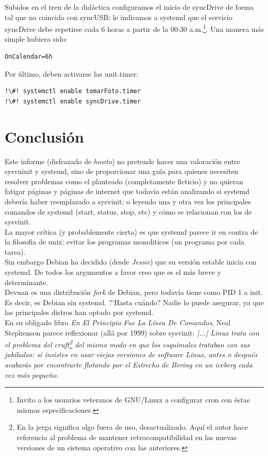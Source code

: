 \documentclass[10pt,a4paper]{article}
\begin{document}
Subidos en el tren de la did\'actica configuramos el inicio de syncDrive de forma tal que no coincida con syncUSB: le indicamos a systemd que el servicio syncDrive debe repetirse cada 6 horas a partir de la 00:30 a.m.\footnote{Invito a los usuarios veteranos de GNU/Linux a configurar cron con \'estas mismas especificaciones.}. Una manera m\'as simple hubiera sido:

\begin{lstlisting}
OnCalendar=6h
\end{lstlisting}

Por \'ultimo, deben activarse las unit.timer:

\begin{lstlisting}
!\#! systemctl enable tomarFoto.timer
!\#! systemctl enable syncDrive.timer
\end{lstlisting}

\section{Conclusi\'on}

Este informe (disfrazado de \emph{howto}) no pretende hacer una valoraci\'on entre sysvninit y systemd, sino de proporcionar una gu\'ia para quienes necesiten resolver problemas como el planteado (completamente ficticio) y no quieran fatigar p\'aginas y p\'aginas de internet que todav\'ia est\'an analizando si systemd deber\'ia haber reemplazado a sysvinit; o leyendo una y otra vez los principales comandos de systemd (start, status, stop, etc) y c\'omo se relacionan con los de sysvinit.\\

La mayor cr\'itica (y probablemente cierta) es que systemd parece ir en contra de la filosofia de unix: evitar los programas monoliticos (un programa por cada tarea).\\

Sin embargo Debian ha decidido (desde \emph{Jessie}) que su versi\'on estable inicia con systemd. De todos los argumentos a favor creo que es el m\'as breve y determinante.\\

Devuan es una distribuci\'on \emph{fork} de Debian, pero todav\'ia tiene como PID 1 a init. Es decir, es Debian sin systemd. ?`Hasta cu\'ando? Nadie lo puede asegurar, ya que las principales distros han optado por systemd.\\

En su obligado libro \emph{En El Principio Fue La L\'inea De Comandos}, Neal Stephenson parece reflexionar (all\'a por 1999) sobre sysvinit: \emph{[...] Linux trata con el problema del cruft\footnote{En la jerga significa algo fuera de uso, desactualizado. Aqu\'i el autor hace referencia al problema de mantener retrocompatibilidad en las nuevas versiones de un sistema operativo con las anteriores.} del mismo modo en que los esquimales trataban con sus jubilados: si insistes en usar viejas versiones de software Linux, antes o después acabarás por encontrarte flotando por el Estrecho de Bering en un iceberg cada vez más pequeño.}
\end{document}
